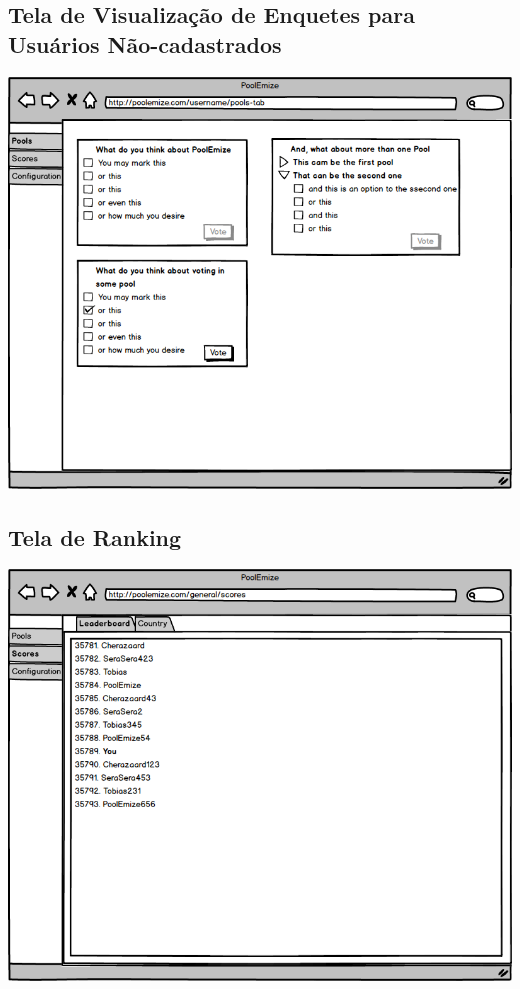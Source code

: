 \documentclass[a4paper,12pt]{report}
\begin{document}
\subsection*{Tela de Visualização de Enquetes para Usuários Não-cadastrados}
\markright{}
\includegraphics[width=14.3cm]{mockups/GeneralPoollsScreenTab.png}
\subsection*{Tela de Ranking}
\markright{}
\includegraphics[width=14.3cm]{mockups/GeneralScoreScreenTab.png}
\end{document}
